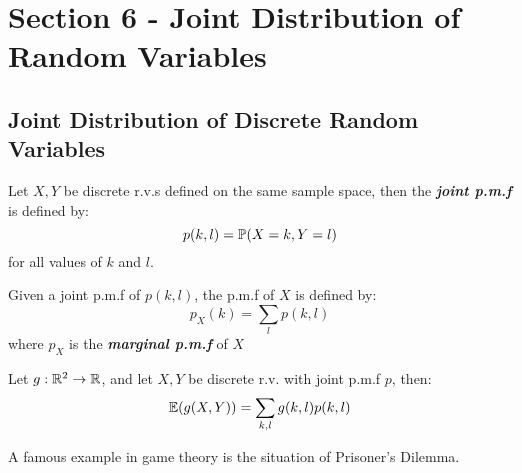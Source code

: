 \section{Section 6 - Joint Distribution of Random Variables}
\subsection{Joint Distribution of Discrete Random Variables}
\begin{definition}
    Let $X, Y$ be discrete r.v.s defined on the same sample space, then the \textbf{\textit{joint p.m.f}} is defined by:
    $$p(k, l) = \mathbb{P}(X = k, Y = l)$$
    for all values of $k$ and $l$.
\end{definition}
\begin{definition}
    Given a joint p.m.f of $p(k, l)$, the p.m.f of $X$ is defined by:
    $$p_X(k) = \sum_{l}p(k, l)$$
    where $p_X$ is the \textbf{\textit{marginal p.m.f}} of $X$
\end{definition}
\begin{theorem}
    Let $g: \mathbb{R}^2 \to \mathbb{R}$, and let $X, Y$ be discrete r.v. with joint p.m.f $p$, then:
    $$\mathbb{E}(g(X, Y)) = \sum_{k, l} g(k, l)p(k, l)$$
\end{theorem}
A famous example in game theory is the situation of Prisoner's Dilemma.


